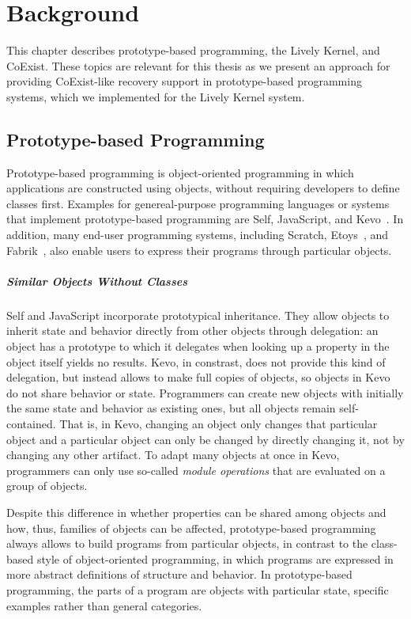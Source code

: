\chapter{Background} \label{chapter:BACKGROUND}

This chapter describes prototype-based programming, the Lively Kernel, and CoExist.
These topics are relevant for this thesis as we present an approach for providing CoExist-like recovery support in prototype-based programming systems, which we implemented for the Lively Kernel system.

\section{Prototype-based Programming}

Prototype-based programming is object-oriented programming in which applications are constructed using objects, without requiring developers to define classes first.
Examples for genereal-purpose programming languages or systems that implement prototype-based programming are Self, JavaScript, and Kevo~\cite{Taivalsaari1992Kevo}.
In addition, many end-user programming systems, including Scratch\cite{Maloney2010SPL}, Etoys~\cite{Kay2005Etoys}, and Fabrik~\cite{Ingalls1988FVP}, also enable users to express their programs through particular objects.

\paragraph{Similar Objects Without Classes}
Self and JavaScript incorporate prototypical inheritance.
They allow objects to inherit state and behavior directly from other objects through delegation: an object has a prototype to which it delegates when looking up a property in the object itself yields no results.
Kevo, in constrast, does not provide this kind of delegation, but instead allows to make full copies of objects, so objects in Kevo do not share behavior or state.
Programmers can create new objects with initially the same state and behavior as existing ones, but all objects remain self-contained.
That is, in Kevo, changing an object only changes that particular object and a particular object can only be changed by directly changing it, not by changing any other artifact.
To adapt many objects at once in Kevo, programmers can only use so-called \emph{module operations} that are evaluated on a group of objects. 

Despite this difference in whether properties can be shared among objects and how, thus, families of objects can be affected, prototype-based programming always allows to build programs from particular objects, in contrast to the class-based style of object-oriented programming, in which programs are expressed in more abstract definitions of structure and behavior.
In prototype-based programming, the parts of a program are objects with particular state, specific examples rather than general categories.

